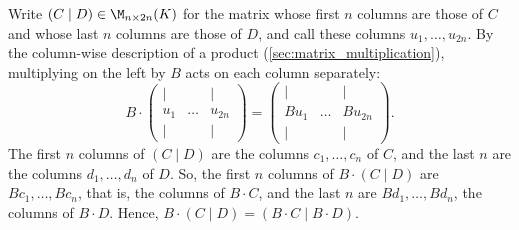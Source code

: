 \begin{exercisesolution}
\label{sol:block_matrix_multiplication}
Write $(C \mid D) \in \M_{n \times 2n}(K)$ for the matrix whose first $n$ columns are those of $C$ and whose last $n$ columns are those of $D$, and call these columns $u_1, \dots, u_{2n}$. By the column-wise description of a product (\cref{sec:matrix_multiplication}), multiplying on the left by $B$ acts on each column separately:
\[
B \cdot \begin{pmatrix} | & & | \\ u_1 & \dots & u_{2n} \\ | & & | \end{pmatrix} = \begin{pmatrix} | & & | \\ B u_1 & \dots & B u_{2n} \\ | & & | \end{pmatrix}.
\]
The first $n$ columns of $(C \mid D)$ are the columns $c_1, \dots, c_n$ of $C$, and the last $n$ are the columns $d_1, \dots, d_n$ of $D$. So, the first $n$ columns of $B \cdot (C \mid D)$ are $Bc_1, \dots, Bc_n$, that is, the columns of $B \cdot C$, and the last $n$ are $Bd_1, \dots, Bd_n$, the columns of $B \cdot D$. Hence, $B \cdot (C \mid D) = (B \cdot C \mid B \cdot D)$.
\end{exercisesolution}



